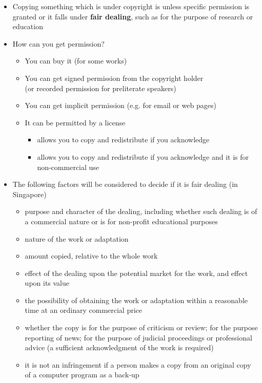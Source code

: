 \documentclass[a4paper,landscape,headrule,footrule,xetex]{foils}
\begin{document}
\begin{center}
\end{center}


\begin{itemize}
\item Copying something which is under copyright is  unless
  specific permission is granted or it falls under \textbf{fair
    dealing}, such as for the purpose of research or education
\item How can you get permission?
  \begin{itemize}
  \item You can buy it (for some works)
  \item You can get signed permission from the copyright holder
\\ (or recorded permission for preliterate speakers)
  \item You can get implicit permission (e.g. for email or web pages)
  \item It can be permitted by a license
    \begin{itemize}
    \item {} allows you to copy and redistribute if you acknowledge
    \item {} allows you to copy and redistribute if you
      acknowledge and it is for non-commercial use
    \end{itemize}
  \end{itemize}

\newpage {}
\item The following factors will be considered to decide if it is fair
  dealing (in Singapore)
  \begin{itemize}
  \item  purpose and character of the dealing, including whether such dealing is of a commercial nature or is for non-profit educational purposes
  \item  nature of the work or adaptation
  \item amount copied, relative to the whole work
  \item  effect of the dealing upon the potential market for the work, and effect upon its value
  \item the possibility of obtaining the work or adaptation within a reasonable time at an ordinary commercial price
  \item whether the copy is for the purpose of criticism or review; for the purpose reporting of news; for the purpose of judicial proceedings or professional advice (a sufficient acknowledgment of the work is required)
  \item it is not an infringement if a person makes a copy from an
    original copy of a computer program  as a back-up
  \end{itemize}
\end{itemize}
\end{document}
